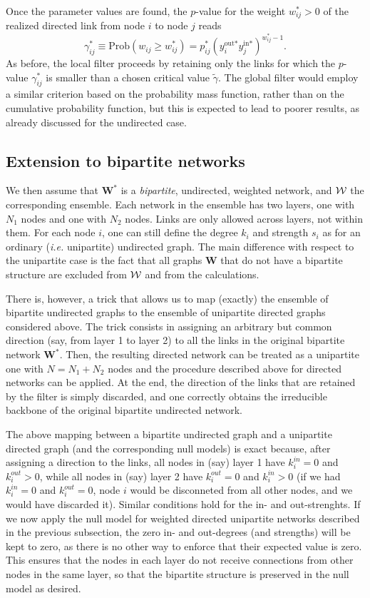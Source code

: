 \documentclass[aps,twocolumn,superscriptaddress]{revtex4-1}
\newcommand{\ie}{\emph{i.e.} }
\begin{document}
Once the parameter values are found, the $p$-value for the weight $w_{ij}^*>0$ of the realized directed link from node $i$ to node $j$ reads
\begin{equation}
\gamma_{ij}^{\ast} \equiv \textrm{Prob}(w_{ij} \geq w_{ij}^{\ast})=
p^\ast_{ij}\left( y^{\textrm{out}\ast}_i y^{\textrm{in}\ast}_j \right)^{w_{ij}^{\ast}-1}.
\end{equation}
As before, the local filter proceeds by retaining only the links for which the $p$-value $\gamma_{ij}^{\ast}$ is smaller than a chosen critical value $\widetilde{\gamma}$.
The global filter would employ a similar criterion based on the probability mass function, rather than on the cumulative probability function, but this is expected to lead to poorer results, as already discussed for the undirected case.

\subsection{Extension to bipartite networks}
We then assume that $\bm{W}^\ast$ is a \emph{bipartite}, undirected, weighted network, and $\cal{W}$ the corresponding ensemble.
Each network in the ensemble has two layers, one with $N_1$ nodes and one with $N_2$ nodes. 
Links are only allowed across layers, not within them.
For each node $i$, one can still define the degree $k_i$ and strength $s_i$ as for an ordinary (\ie unipartite) undirected graph.
The main difference with respect to the unipartite case is the fact that all graphs $\bm{W}$ that do not have a bipartite structure are excluded from $\cal{W}$ and from the calculations.

There is, however, a trick that allows us to map (exactly) the ensemble of bipartite undirected graphs to the ensemble of unipartite directed graphs considered above.
The trick consists in assigning an arbitrary but common direction (say, from layer 1 to layer 2) to all the links in the original bipartite network $\bm{W}^*$. Then, the resulting directed network can be treated as a unipartite one with $N=N_1+N_2$ nodes and the procedure described above for directed networks can be applied. 
At the end, the direction of the links that are retained by the filter is simply discarded, and one correctly obtains the irreducible backbone of the original bipartite undirected network.

The above mapping between a bipartite undirected graph and a unipartite directed graph (and the corresponding null models) is exact because, after assigning a direction to the links, all nodes in (say) layer 1 have $k^{in}_i=0$ and $k^{out}_i>0$, while all nodes in (say) layer 2 have $k^{out}_i=0$ and $k^{in}_i>0$ (if we had $k^{in}_i=0$ and $k^{out}_i=0$, node $i$ would be disconneted from all other nodes, and we would have discarded it). Similar conditions hold for the in- and out-strenghts.
If we now apply the null model for weighted directed unipartite networks described in the previous subsection, the zero in- and out-degrees (and strengths) will be kept to zero, as there is no other way to enforce that their expected value is zero.
This ensures that the nodes in each layer do not receive connections from other nodes in the same layer, so that the bipartite structure is preserved in the null model as desired.
\end{document}
